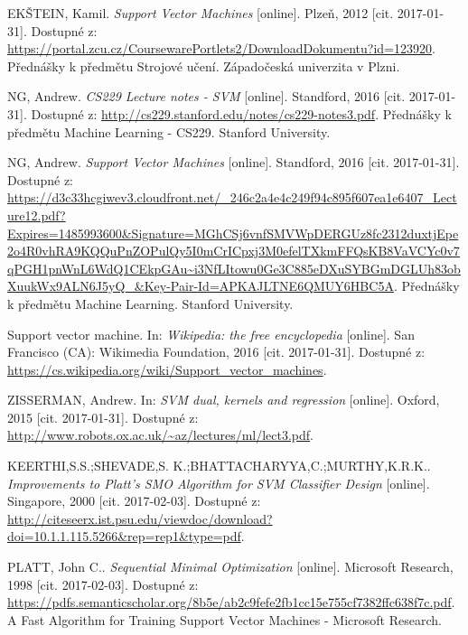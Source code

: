 \documentclass[a4]{article}
\begin{document}
\appendix
\begin{thebibliography}{99}

EKŠTEIN, Kamil. \textit{Support Vector Machines} [online]. Plzeň, 2012 [cit. 2017-01-31]. Dostupné z: \url{https://portal.zcu.cz/CoursewarePortlets2/DownloadDokumentu?id=123920}. Přednášky k předmětu Strojové učení. Západočeská univerzita v Plzni.

NG, Andrew. \textit{CS229 Lecture notes - SVM} [online]. Standford, 2016 [cit. 2017-01-31]. Dostupné z: \url{http://cs229.stanford.edu/notes/cs229-notes3.pdf}. Přednášky k předmětu Machine Learning - CS229. Stanford University.

NG, Andrew. \textit{Support Vector Machines} [online]. Standford, 2016 [cit. 2017-01-31]. Dostupné z: \url{https://d3c33hcgiwev3.cloudfront.net/_246c2a4e4c249f94c895f607ea1e6407_Lecture12.pdf?Expires=1485993600&Signature=MGhCSj6vnfSMVWpDERGUz8fc2312duxtjEpe2o4R0vhRA9KQQuPnZOPulQy5I0mCrICpxj3M0efelTXkmFFQsKB8VaVCYc0v7qPGH1pnWnL6WdQ1CEkpGAu~i3NfLItowu0Ge3C885eDXuSYBGmDGLUh83obXuukWx9ALN6J5yQ_&Key-Pair-Id=APKAJLTNE6QMUY6HBC5A}. Přednášky k předmětu Machine Learning. Stanford University.

Support vector machine. In: \textit{Wikipedia: the free encyclopedia} [online]. San Francisco (CA): Wikimedia Foundation, 2016 [cit. 2017-01-31]. Dostupné z: \url{https://cs.wikipedia.org/wiki/Support_vector_machines}.

ZISSERMAN, Andrew. In: \textit{SVM dual, kernels and regression} [online]. Oxford, 2015 [cit. 2017-01-31]. Dostupné z: \url{http://www.robots.ox.ac.uk/~az/lectures/ml/lect3.pdf}.

KEERTHI,S.S.;SHEVADE,S. K.;BHATTACHARYYA,C.;MURTHY,K.R.K.. \textit{Improvements to Platt’s SMO Algorithm for SVM Classifier
Design} [online]. Singapore, 2000 [cit. 2017-02-03]. Dostupné z: \url{http://citeseerx.ist.psu.edu/viewdoc/download?doi=10.1.1.115.5266&rep=rep1&type=pdf}.

PLATT, John C.. \textit{Sequential Minimal Optimization} [online]. Microsoft Research, 1998 [cit. 2017-02-03]. Dostupné z: \url{https://pdfs.semanticscholar.org/8b5e/ab2c9fefe2fb1cc15e755cf7382ffc638f7c.pdf}. A Fast Algorithm for Training Support Vector Machines - Microsoft Research.

\end{thebibliography}
\newpage
\end{document}
